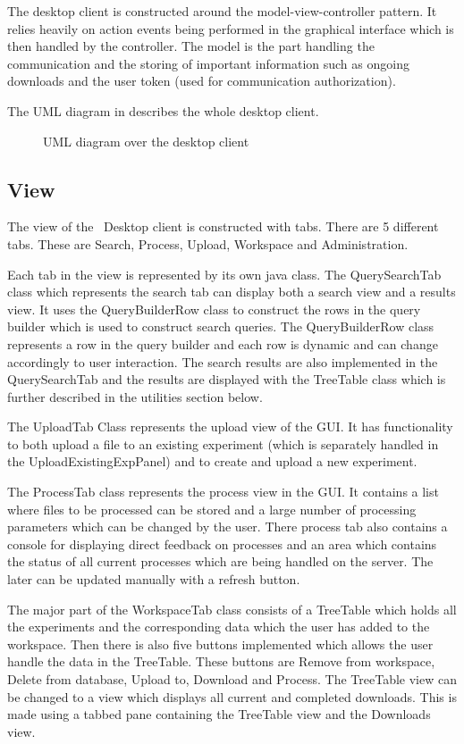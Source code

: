 The desktop client is constructed around the model-view-controller pattern. It relies heavily on action events being performed in the graphical interface which is then handled by the controller. The model is the part handling the communication and the storing of important information such as ongoing downloads and the user token (used for communication authorization).

The UML diagram in  describes the whole desktop client.
\begin{figure}[htb!]
	\caption{UML diagram over the desktop client}
	\label{fig:des_uml-overview}
\end{figure}


\subsection{View}
The view of the \appName\ Desktop client is constructed with tabs. There are 5 different tabs. These are Search, Process, Upload, Workspace and Administration.

Each tab in the view is represented by its own java class. The QuerySearchTab class which represents the search tab can display both a search view and a results view. It uses the QueryBuilderRow class to construct the rows in the query builder which is used to construct search queries. The QueryBuilderRow class represents a row in the query builder and each row is dynamic and can change accordingly to user interaction. The search results are also implemented in the QuerySearchTab and the results are displayed with the TreeTable class which is further described in the utilities section below.

The UploadTab Class represents the upload view of the GUI. It has functionality to both upload a file to an existing experiment (which is separately handled in the UploadExistingExpPanel) and to create and upload a new experiment.

The ProcessTab class represents the process view in the GUI. It contains a list where files to be processed can be stored and a large number of processing parameters which can be changed by the user. There process tab also contains a console for displaying direct feedback on processes and an area which contains the status of all current processes which are being handled on the server. The later can be updated manually with a refresh button.

The major part of the WorkspaceTab class consists of a TreeTable which holds all the experiments and the corresponding data which the user has added to the workspace. Then there is also five buttons implemented which allows the user handle the data in the TreeTable. These buttons are Remove from workspace, Delete from database, Upload to, Download and Process. The TreeTable view can be changed to a view which displays all current and completed downloads. This is made using a tabbed pane containing the TreeTable view and the Downloads view.

